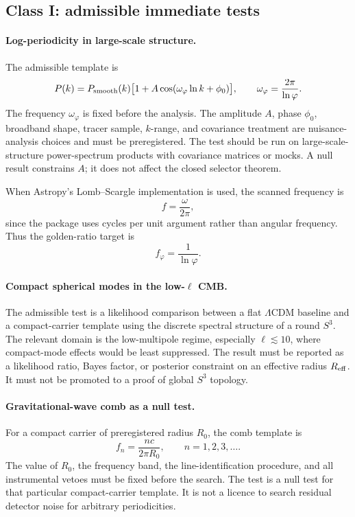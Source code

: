 \documentclass[11pt,a4paper]{article}
\begin{document}
\subsection{Class I: admissible immediate tests}

\paragraph{Log-periodicity in large-scale structure.}
The admissible template is
\[
P(k)=P_{\rm smooth}(k)
\bigl[
1+A\cos(\omega_\varphi\ln k+\phi_0)
\bigr],
\qquad
\omega_\varphi=\frac{2\pi}{\ln\varphi}.
\]
The frequency $\omega_\varphi$ is fixed before the analysis.  The amplitude $A$, phase $\phi_0$, broadband shape, tracer sample, $k$-range, and covariance treatment are nuisance-analysis choices and must be preregistered.  The test should be run on large-scale-structure power-spectrum products with covariance matrices or mocks.  A null result constrains $A$; it does not affect the closed selector theorem.

When Astropy's Lomb--Scargle implementation is used, the scanned frequency is
\[
f=\frac{\omega}{2\pi},
\]
since the package uses cycles per unit argument rather than angular frequency.  Thus the golden-ratio target is
\[
f_\varphi=\frac{1}{\ln\varphi}.
\]

\paragraph{Compact spherical modes in the low-$\ell$ CMB.}
The admissible test is a likelihood comparison between a flat $\Lambda$CDM baseline and a compact-carrier template using the discrete spectral structure of a round $S^3$.  The relevant domain is the low-multipole regime, especially $\ell\lesssim10$, where compact-mode effects would be least suppressed.  The result must be reported as a likelihood ratio, Bayes factor, or posterior constraint on an effective radius $R_{\rm eff}$.  It must not be promoted to a proof of global $S^3$ topology.

\paragraph{Gravitational-wave comb as a null test.}
For a compact carrier of preregistered radius $R_0$, the comb template is
\[
f_n=\frac{nc}{2\pi R_0},
\qquad n=1,2,3,\ldots .
\]
The value of $R_0$, the frequency band, the line-identification procedure, and all instrumental vetoes must be fixed before the search.  The test is a null test for that particular compact-carrier template.  It is not a licence to search residual detector noise for arbitrary periodicities.
\end{document}
